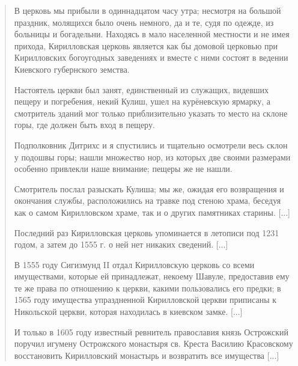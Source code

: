 \begin{quotation}
В церковь мы прибыли в одиннадцатом часу утра; несмотря на большой праздник, молящихся было очень немного, да и те, судя по одежде, из больницы и богадельни. Находясь в мало населенной местности и не имея прихода, Кирилловская церковь является как бы домовой церковью при Кирилловских богоугодных заведениях и вместе с ними состоят в ведении Киевского губернского земства.



Настоятель церкви был занят, единственный из служащих, видевших пещеру и погребения, некий Кулиш, ушел на курёневскую ярмарку, а смотритель зданий мог только приблизительно указать то место на склоне горы, где должен быть вход в пещеру.

Подполковник Дитрихс и я спустились и тщательно осмотрели весь склон у подошвы горы; нашли множество нор, из которых две своими размерами особенно привлекли наше внимание; пещеры же не нашли.

Смотритель послал разыскать Кулиша; мы же, ожидая его возвращения и окончания службы, расположились на травке под стеною храма, беседуя как о самом Кирилловском храме, так и о других памятниках старины. [...]

Последний раз Кирилловская церковь упоминается в летописи под 1231 годом, а затем до 1555 г. о ней нет никаких сведений. [...]


В 1555 году Сигизмунд II отдал Кирилловскую церковь со всеми имуществами, которые ей принадлежат, некоему Шавуле, предоставив ему те же права по отношению к церкви, какими пользовались его предки; в 1565 году имущества упраздненной Кирилловской церкви приписаны к Никольской церкви, которая находилась в киевском замке. [...]

И только в 1605 году известный ревнитель православия князь Острожский поручил игумену Острожского монастыря св. Креста Василию Красовскому восстановить Кирилловский монастырь и возвратить все имущества [...]


\end{quotation}
